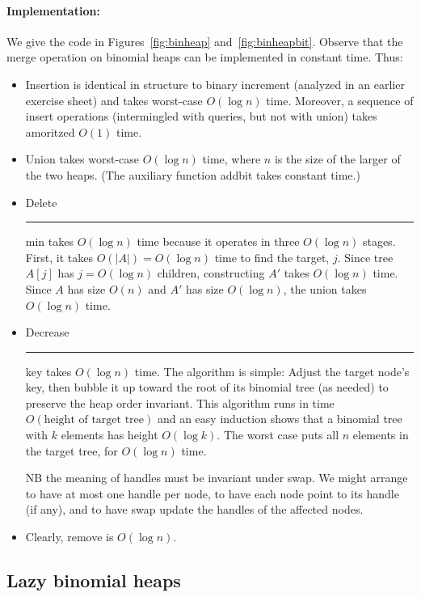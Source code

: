 \documentclass[a4paper]{article}
\newcommand{\any}{{\rule[-.2ex]{1ex}{.4pt}}}	%
\begin{document}
\paragraph{Implementation:}
We give the code in Figures~\ref{fig:binheap} and~\ref{fig:binheapbit}.
Observe that the merge operation on binomial heaps can be implemented in constant time.
Thus:
\begin{itemize}

\item
Insertion is identical in structure to binary increment (analyzed in an earlier exercise sheet) and takes worst-case $O(\log n)$ time.
Moreover, a sequence of insert operations (intermingled with queries, but not with union) takes amoritzed $O(1)$ time.

\item
Union takes worst-case $O(\log n)$ time, where $n$ is the size of the larger of the two heaps.
(The auxiliary function addbit takes constant time.)

\item
Delete\any{}min takes $O(\log n)$ time because it operates in three $O(\log n)$ stages.
First, it takes $O(|A|) = O(\log n)$ time to find the target, $j$.
Since tree $A[j]$ has $j = O(\log n)$ children, constructing $A'$ takes $O(\log n)$ time.
Since $A$ has size $O(n)$ and $A'$ has size $O(\log n)$, the union takes $O(\log n)$ time.

\item
Decrease\any{}key takes $O(\log n)$ time.
The algorithm is simple:
Adjust the target node's key, then bubble it up toward the root of its binomial tree (as needed) to preserve the heap order invariant.
This algorithm runs in time $O(\text{height of target tree})$ and an easy induction shows that a binomial tree with $k$ elements has height $O(\log k)$.
The worst case puts all $n$ elements in the target tree, for $O(\log n)$ time.

NB the meaning of handles must be invariant under swap.
We might arrange to have at most one handle per node, to have each node point to its handle (if any), and to have swap update the handles of the affected nodes.

\item
Clearly, remove is $O(\log n)$.

\end{itemize}

\subsection{Lazy binomial heaps}\label{sec:binfibheap}
\end{document}
